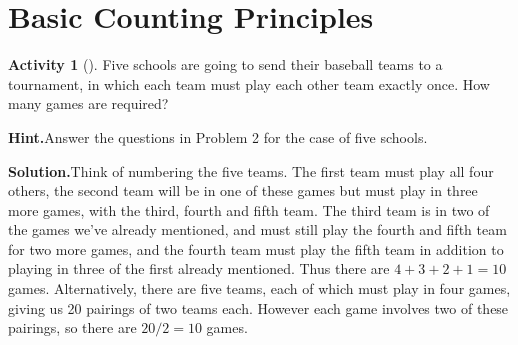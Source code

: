 \documentclass[10pt,]{book}
\theoremstyle{plain}
\theoremstyle{definition}
\newtheorem{activity}[project]{Activity}
\numberwithin{equation}{chapter}
\begin{document}
\section[{Basic Counting Principles}]{Basic Counting Principles}\label{section-2}
\typeout{************************************************}
\typeout{************************************************}
\begin{activity}[]\label{fiveteamtournament}
Five schools are going to send their baseball teams to a tournament, in which each team must play each other team exactly once. How many games are required?%
\par\medskip\noindent%
\textbf{Hint.}\quad Answer the questions in Problem 2 for the case of five schools.%
\par\medskip\noindent%
\textbf{Solution.}\quad Think of numbering the five teams. The first team must play all four others, the second team will be in one of these games but must play in three more games, with the third, fourth and fifth team. The third team is in two of the games we've already mentioned, and must still play the fourth and fifth team for two more games, and the fourth team must play the fifth team in addition to playing in three of the first already mentioned. Thus there are \(4+3+2+1 = 10\) games. Alternatively, there are five teams, each of which must play in four games, giving us 20 pairings of two teams each. However each game involves two of these pairings, so there are \(20/2 =10\) games.%
\end{activity}
\end{document}
